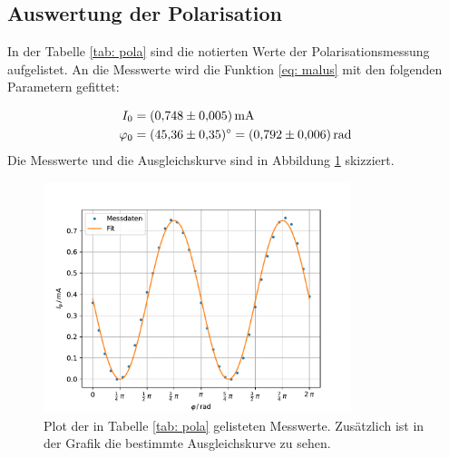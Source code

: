 \subsection{Auswertung der Polarisation}

In der Tabelle \ref{tab: pola} sind die notierten Werte der Polarisationsmessung
aufgelistet.
\FloatBarrier
An die Messwerte wird die Funktion \eqref{eq: malus} %
mit den folgenden Parametern gefittet:

\begin{align}
  \label{eq: fit_pola}
  \begin{aligned}
  I_0&=\SI{0.748\pm0.005}{\milli\ampere}\\ %
  \varphi_0&=\SI{45.36\pm0.35}{\degree}=\SI{0.792\pm0.006}{\radian}
\end{aligned}
\end{align}
Die Messwerte und die Ausgleichskurve sind in Abbildung \ref{fig: pola} skizziert.

\begin{figure}[h!]
  \centering
  \includegraphics[width=0.8\textwidth]{../Messdaten/plots/pola.pdf}
  \caption{Plot der in Tabelle \ref{tab: pola} gelisteten Messwerte. Zusätzlich ist in der Grafik die bestimmte Ausgleichskurve zu sehen.}
  \label{fig: pola}
\end{figure}
\FloatBarrier

\FloatBarrier
